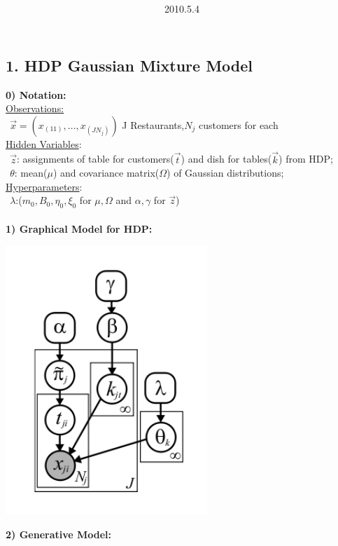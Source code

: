 \documentclass{article}
\title{\vspace{0.3in}\textmd{\textbf{\hmwkTitle}}}
\date{2010.5.4}
\author{\textbf{\hmwkAuthorName}}
\begin{document}
\begin{spacing}{1.1}
\maketitle



  
\section{1. HDP Gaussian Mixture Model}
\large {\bf 0) Notation:}\\
 \underline{Observations:}\\
  $\ \ \vec x=(x_{(11)},...,x_{(JN_{j})})$ J Restaurants,$N_{j}$ customers for each   \\
 \underline{Hidden Variables}:\\
  $\ \ \vec z$: assignments of table for customers($\vec t$) and dish for tables($\vec k$) from HDP;\\    
  $\ \ \theta$: mean($\mu$) and covariance matrix($\Omega$) of Gaussian distributions;\\ 
 \underline{Hyperparameters}:\\
 $\ \ \lambda$:($m_{0},B_{0},\eta_{0},\xi_{0}$ for $\mu,\Omega$ and $\alpha,\gamma$ for $\vec z$) \\ \\ 
\large {\bf 1) Graphical Model for HDP:}\\
\begin{center}
    \includegraphics[width=3in,height=4in]{hdp.jpg} 
\end{center}
\large {\bf 2) Generative Model:}\\

\end{spacing}
\end{document}

